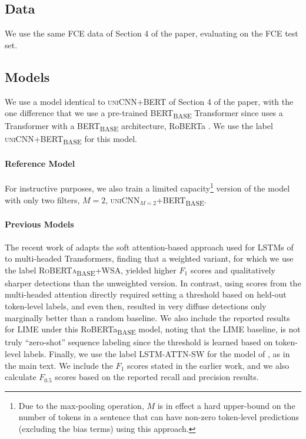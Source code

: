 \documentclass{clv3}
\begin{document}

\label{sec:fce-additional}
\subsection{Data} We use the same FCE data of Section 4 of the paper, evaluating on the FCE test set.

\subsection{Models} We use a model identical to \textsc{uniCNN+BERT} of Section 4 of the paper, with the one difference that we use a pre-trained BERT\textsubscript{BASE} Transformer since \citet{BujelEtAl-2021-Zeroshot-Weighted-Attention} uses a Transformer with a BERT\textsubscript{BASE} architecture, RoBERTa \cite{LiuEtAl-2019-RoBERTa}. We use the label \textsc{uniCNN+BERT\textsubscript{BASE}} for this model.

\paragraph{Reference Model}

For instructive purposes, we also train a limited capacity\footnote{Due to the max-pooling operation, $M$ is in effect a hard upper-bound on the number of tokens in a sentence that can have non-zero token-level predictions (excluding the bias terms) using this approach.} version of the model with only two filters, $M=2$, \textsc{uniCNN$_{M=2}$+BERT\textsubscript{BASE}}. 


\paragraph{Previous Models} The recent work of \citet{BujelEtAl-2021-Zeroshot-Weighted-Attention} adapts the soft attention-based approach used for LSTMs of \citet{ReiAndSogaard-2018-ZeroShotSeq} to multi-headed Transformers, finding that a weighted variant, for which we use the label \textsc{RoBERTa\textsubscript{BASE}+WSA}, yielded higher $F_1$ scores and qualitatively sharper detections than the unweighted version. In contrast, using scores from the multi-headed attention directly required setting a threshold based on held-out token-level labels, and even then, resulted in very diffuse detections only marginally better than a random baseline. We also include the reported results for \textsc{LIME} \cite{RibeiroEtal-2016-LIME} under this RoBERTa\textsubscript{BASE} model, noting that the \textsc{LIME} baseline, is not truly ``zero-shot'' sequence labeling since the threshold is learned based on token-level labels. Finally, we use the label \textsc{LSTM-ATTN-SW} for the model of \citet{ReiAndSogaard-2018-ZeroShotSeq}, as in the main text. We include the $F_1$ scores stated in the earlier work, and we also calculate $F_{0.5}$ scores based on the reported recall and precision results.
\end{document}
